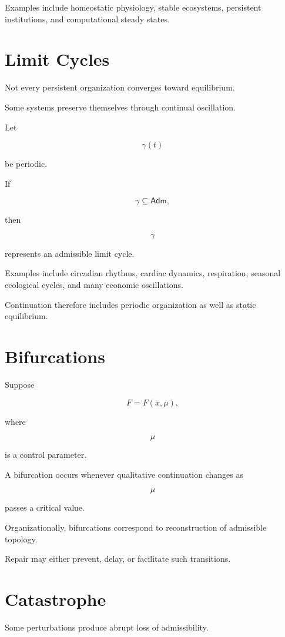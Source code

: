 \documentclass[11pt,oneside]{book}
\numberwithin{equation}{chapter}
\theoremstyle{definition}
\theoremstyle{plain}
\newcommand{\Adm}{\mathsf{Adm}}
\begin{document}
Examples include homeostatic physiology, stable ecosystems, persistent
institutions, and computational steady states.

\section{Limit Cycles}

Not every persistent organization converges toward equilibrium.

Some systems preserve themselves through continual oscillation.

Let

\[
\gamma(t)
\]

be periodic.

If

\[
\gamma
\subseteq
\Adm,
\]

then

\[
\gamma
\]

represents an admissible limit cycle.

Examples include circadian rhythms, cardiac dynamics, respiration,
seasonal ecological cycles, and many economic oscillations.

Continuation therefore includes periodic organization as well as static
equilibrium.

\section{Bifurcations}

Suppose

\[
F
=
F(x,\mu),
\]

where

\[
\mu
\]

is a control parameter.

A bifurcation occurs whenever qualitative continuation changes as

\[
\mu
\]

passes a critical value.

Organizationally, bifurcations correspond to reconstruction of admissible
topology.

Repair may either prevent, delay, or facilitate such transitions.

\section{Catastrophe}

Some perturbations produce abrupt loss of admissibility.
\end{document}
